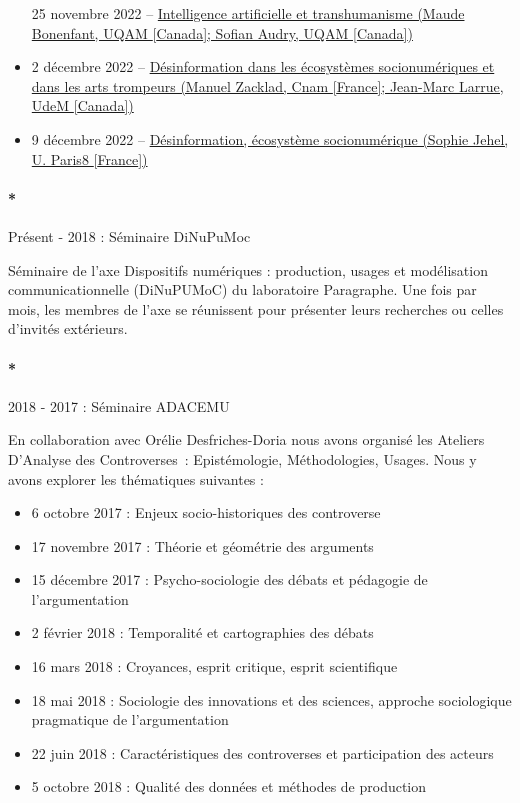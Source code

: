 \documentclass[
  a4paper,
  DIV=11,
  numbers=noendperiod]{scrreprt}
\let\oldparagraph\paragraph
\renewcommand{\paragraph}[1]{\oldparagraph{#1}\mbox{}}
\begin{document}
\begin{itemize}
  25 novembre 2022 --
  \href{https://crilcq.arcanes.ca/event/intelligence-artificielle-et-transhumanisme-maude-bonenfant-uqam-canada-sofian-audry-uqam-canada/}{Intelligence
  artificielle et transhumanisme (Maude Bonenfant, UQAM {[}Canada{]};
  Sofian Audry, UQAM {[}Canada{]})}
\item
  2 décembre 2022 --
  \href{https://crilcq.arcanes.ca/event/desinformation-ecosysteme-socionumerique-invite-e-s-a-confirmer/}{Désinformation
  dans les écosystèmes socionumériques et dans les arts trompeurs
  (Manuel Zacklad, Cnam {[}France{]}; Jean-Marc Larrue, UdeM
  {[}Canada{]})}
\item
  9 décembre 2022 --
  \href{https://crilcq.arcanes.ca/event/presentations-des-etudiants/}{Désinformation,
  écosystème socionumérique (Sophie Jehel, U. Paris8 {[}France{]})}
\end{itemize}

\paragraph*{Présent - 2018 : Séminaire
DiNuPuMoc}\label{pruxe9sent---2018-suxe9minaire-dinupumoc}

Séminaire de l'axe Dispositifs numériques : production, usages et
modélisation communicationnelle (DiNuPUMoC) du laboratoire Paragraphe.
Une fois par mois, les membres de l'axe se réunissent pour présenter
leurs recherches ou celles d'invités extérieurs.

\paragraph*{2018 - 2017 : Séminaire ADACEMU}\label{sec-seminaireAdacemu}

En collaboration avec Orélie Desfriches-Doria nous avons organisé les
Ateliers D'Analyse des Controverses~: Epistémologie, Méthodologies,
Usages. Nous y avons explorer les thématiques suivantes :

\begin{itemize}
\item
  6 octobre 2017 : Enjeux socio-historiques des controverse
\item
  17 novembre 2017 : Théorie et géométrie des arguments
\item
  15 décembre 2017 : Psycho-sociologie des débats et pédagogie de
  l'argumentation
\item
  2 février 2018 : Temporalité et cartographies des débats
\item
  16 mars 2018 : Croyances, esprit critique, esprit scientifique
\item
  18 mai 2018 : Sociologie des innovations et des sciences, approche
  sociologique pragmatique de l'argumentation
\item
  22 juin 2018 : Caractéristiques des controverses et participation des
  acteurs
\item
  5 octobre 2018 : Qualité des données et méthodes de production
\end{itemize}
\end{document}
